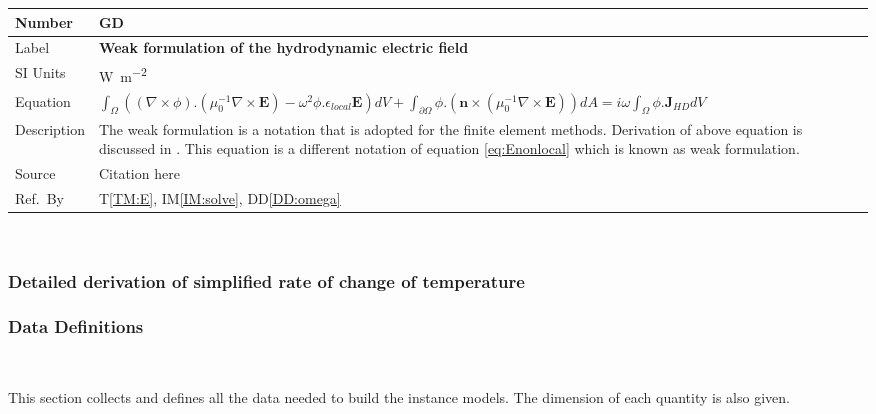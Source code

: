 \documentclass[12pt]{article}
\newcommand{\colBwidth}{0.82\textwidth} \newcommand{\colCwidth}{0.1\textwidth}
\newcounter{defnum} %
\begin{document}
	\noindent \begin{minipage}{\textwidth} \renewcommand*{\arraystretch}{1.5}
		\begin{tabular}{| p{\colAwidth} | p{\colBwidth}|} \hline \rowcolor[gray]{0.9}
			Number& GD{defnum}\thedefnum \label{GD:weakE}\\ \hline Label &\bf
			Weak formulation of the hydrodynamic electric field \\ \hline %
			SI Units&\si{\watt\per\square\metre}\\ \hline Equation& $\int_\Omega ((\nabla
			\times \phi) . (\mu^{-1}_0 \nabla \times \textbf{E})-\omega^2
			\phi.\epsilon_{local} \textbf{E}) dV + \int_{\partial \Omega} \phi.(\textbf{n}
			\times (\mu^{-1}_0 \nabla \times \textbf{E}))dA = i\omega \int_\Omega \phi.
			\textbf{J}_{HD} dV $ \\ \hline Description & The weak formulation is a notation
			that is adopted for the finite element methods. Derivation of above equation is
			discussed in \cite{hiremath2012numerical}. This equation is a different notation
			of equation \ref{eq:Enonlocal} which is known as weak formulation. \\ \hline
			Source & Citation here \\ \hline Ref.\ By &T\ref{TM:E}, IM\ref{IM:solve},
			DD\ref{DD:omega}\\ \hline \end{tabular} \end{minipage}\\
	
	\subsubsection*{Detailed derivation of simplified rate of change of temperature}
	
	
	
	\subsubsection{Data Definitions}\label{sec_datadef}
	
	\
	
	This section collects and defines all the data needed to build the instance
	models. The dimension of each quantity is also given.
	
	
\end{document}
